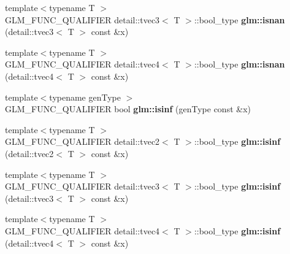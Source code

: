 \begin{DoxyCompactItemize}
\item 
\hypertarget{namespaceglm_a58c44d2114b8e0ab1a3b6669ad6b9c2d}{{\footnotesize template$<$typename T $>$ }\\\-G\-L\-M\-\_\-\-F\-U\-N\-C\-\_\-\-Q\-U\-A\-L\-I\-F\-I\-E\-R \*
detail\-::tvec3$<$ \-T $>$\-::bool\-\_\-type {\bfseries glm\-::isnan} (detail\-::tvec3$<$ \-T $>$ const \&x)}\label{namespaceglm_a58c44d2114b8e0ab1a3b6669ad6b9c2d}

\item 
\hypertarget{namespaceglm_a5c8244b11b884f57c38b5ce1b8938842}{{\footnotesize template$<$typename T $>$ }\\\-G\-L\-M\-\_\-\-F\-U\-N\-C\-\_\-\-Q\-U\-A\-L\-I\-F\-I\-E\-R \*
detail\-::tvec4$<$ \-T $>$\-::bool\-\_\-type {\bfseries glm\-::isnan} (detail\-::tvec4$<$ \-T $>$ const \&x)}\label{namespaceglm_a5c8244b11b884f57c38b5ce1b8938842}

\item 
\hypertarget{namespaceglm_a288b94de0a24c58e6b7575c7d3400b5a}{{\footnotesize template$<$typename gen\-Type $>$ }\\\-G\-L\-M\-\_\-\-F\-U\-N\-C\-\_\-\-Q\-U\-A\-L\-I\-F\-I\-E\-R bool {\bfseries glm\-::isinf} (gen\-Type const \&x)}\label{namespaceglm_a288b94de0a24c58e6b7575c7d3400b5a}

\item 
\hypertarget{namespaceglm_a12f7a78a9bcc77fdd8b542b11b149962}{{\footnotesize template$<$typename T $>$ }\\\-G\-L\-M\-\_\-\-F\-U\-N\-C\-\_\-\-Q\-U\-A\-L\-I\-F\-I\-E\-R \*
detail\-::tvec2$<$ \-T $>$\-::bool\-\_\-type {\bfseries glm\-::isinf} (detail\-::tvec2$<$ \-T $>$ const \&x)}\label{namespaceglm_a12f7a78a9bcc77fdd8b542b11b149962}

\item 
\hypertarget{namespaceglm_ae37f4d04e4a07794197f30ec2cf3f034}{{\footnotesize template$<$typename T $>$ }\\\-G\-L\-M\-\_\-\-F\-U\-N\-C\-\_\-\-Q\-U\-A\-L\-I\-F\-I\-E\-R \*
detail\-::tvec3$<$ \-T $>$\-::bool\-\_\-type {\bfseries glm\-::isinf} (detail\-::tvec3$<$ \-T $>$ const \&x)}\label{namespaceglm_ae37f4d04e4a07794197f30ec2cf3f034}

\item 
\hypertarget{namespaceglm_ad2670da17fe5420caee266f86c1de00e}{{\footnotesize template$<$typename T $>$ }\\\-G\-L\-M\-\_\-\-F\-U\-N\-C\-\_\-\-Q\-U\-A\-L\-I\-F\-I\-E\-R \*
detail\-::tvec4$<$ \-T $>$\-::bool\-\_\-type {\bfseries glm\-::isinf} (detail\-::tvec4$<$ \-T $>$ const \&x)}\label{namespaceglm_ad2670da17fe5420caee266f86c1de00e}


\end{DoxyCompactItemize}

